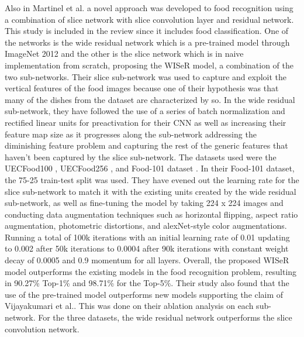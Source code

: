 Also in Martinel et al. \cite{martinel-2018} a novel approach was developed to food recognition using a combination of slice network with slice convolution layer and residual network. This study is included in the review since it includes food classification. One of the networks is the wide residual network which is a pre-trained model through ImageNet 2012 and the other is the slice network which is in naive implementation from scratch, proposing the WISeR model, a combination of the two sub-networks. Their slice sub-network was used to capture and exploit the vertical features of the food images because one of their hypothesis was that many of the dishes from the dataset are characterized by so. In the wide residual sub-network, they have followed the use of a series of batch normalization and rectified linear units for preactivation for their CNN as well as increasing their feature map size as it progresses along the sub-network addressing the diminishing feature problem and capturing the rest of the generic features that haven't been captured by the slice sub-network. The datasets used were the UECFood100 \cite{matsuda-2012}, UECFood256 \cite{kawano-2014,kawano-2015}, and Food-101 dataset \cite{bossard-2014}. In their Food-101 dataset, the 75-25 train-test split was used. They have evened out the learning rate for the slice sub-network to match it with the existing units created by the wide residual sub-network, as well as fine-tuning the model by taking 224 x 224 images and conducting data augmentation techniques such as horizontal flipping, aspect ratio augmentation, photometric distortions, and alexNet-style color augmentations. Running a total of 100k iterations with an initial learning rate of 0.01 updating to 0.002 after 50k iterations to 0.0004 after 90k iterations with constant weight decay of 0.0005 and 0.9 momentum for all layers.  Overall, the proposed WISeR model outperforms the existing models in the food recognition problem, resulting in 90.27\% Top-1\% and 98.71\% for the Top-5\%. Their study also found that the use of the pre-trained model outperforms new models supporting the claim of Vijayakumari et al.\cite{vijayakumari-2022}. This was done on their ablation analysis on each sub-network. For the three datasets, the wide residual network outperforms the slice convolution network.

